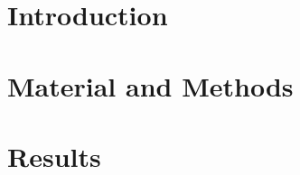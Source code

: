 \documentclass[
oneside,
a4paper,
12pt,
titlepage]
{article}
\begin{document}

\newpage


\newpage


\newpage

\pagestyle{standard}

\section{Introduction}

\section{Material and Methods}
% 

% 
% 
% 
% 



\section{Results}








\newpage{}

\end{document}

